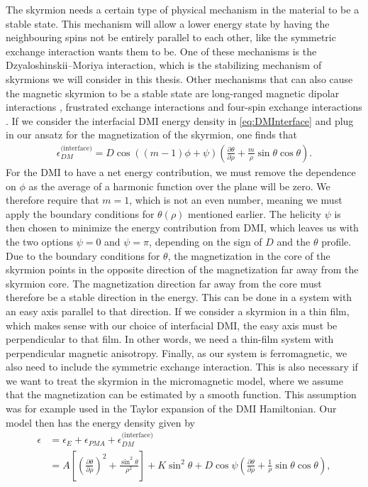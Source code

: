 \documentclass[12pt, a4paper, twoside, openright]{report}
\numberwithin{equation}{chapter}
\numberwithin{figure}{chapter}
\numberwithin{table}{chapter}
\begin{document}
The skyrmion needs a certain type of physical mechanism in the material to be a stable state. This mechanism will allow a lower energy state by having the neighbouring spins not be entirely parallel to each other, like the symmetric exchange interaction wants them to be. One of these mechanisms is the Dzyaloshinskii--Moriya interaction, which is the stabilizing mechanism of skyrmions we will consider in this thesis. Other mechanisms that can also cause the magnetic skyrmion to be a stable state are long-ranged magnetic dipolar interactions \cite{Lin1973}, frustrated exchange interactions \cite{Okubo2012} and four-spin exchange interactions \cite{Heinze2011}. If we consider the interfacial DMI energy density in \eqref{eq:DMInterface} and plug in our ansatz for the magnetization of the skyrmion, one finds that
\begin{align}
\epsilon_{DM}^{\textrm{(interface)}} = D\cos((m-1)\phi + \psi)\left(\frac{\partial\theta}{\partial\rho} + \frac{m}{\rho}\sin\theta\cos\theta\right).
\end{align}
For the DMI to have a net energy contribution, we must remove the dependence on $\phi$ as the average of a harmonic function over the plane will be zero. We therefore require that $m = 1$, which is not an even number, meaning we must apply the boundary conditions for $\theta(\rho)$ mentioned earlier. The helicity $\psi$ is then chosen to minimize the energy contribution from DMI, which leaves us with the two options $\psi = 0$ and $\psi = \pi$, depending on the sign of $D$ and the $\theta$ profile. Due to the boundary conditions for $\theta$, the magnetization in the core of the skyrmion points in the opposite direction of the magnetization far away from the skyrmion core. The magnetization direction far away from the core must therefore be a stable direction in the energy. This can be done in a system with an easy axis parallel to that direction. If we consider a skyrmion in a thin film, which makes sense with our choice of interfacial DMI, the easy axis must be perpendicular to that film. In other words, we need a thin-film system with perpendicular magnetic anisotropy. Finally, as our system is ferromagnetic, we also need to include the symmetric exchange interaction. This is also necessary if we want to treat the skyrmion in the micromagnetic model, where we assume that the magnetization can be estimated by a smooth function. This assumption was for example used in the Taylor expansion of the DMI Hamiltonian. Our model then has the energy density given by
\begin{align}
\nonumber \epsilon &= \epsilon_E + \epsilon_{PMA} + \epsilon_{DM}^{\textrm{(interface)}} \\
&=A \left[\left(\frac{\partial\theta}{\partial\rho}\right)^2 + \frac{\sin^2\theta}{\rho^2}\right] + K\sin^2\theta + D\cos\psi\left(\frac{\partial\theta}{\partial\rho} + \frac{1}{\rho}\sin\theta\cos\theta\right),
\end{align}
\end{document}
